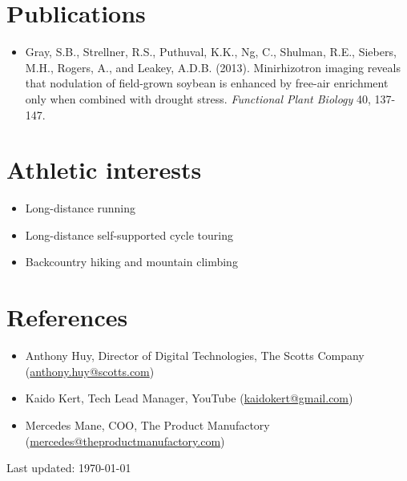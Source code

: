 \documentclass[letterpaper]{article}
\def\footerlink{}
\begin{document}
\section*{Publications}

  \begin{itemize}

    \item Gray, S.B., Strellner, R.S., Puthuval, K.K., Ng, C., Shulman, R.E., Siebers, M.H., Rogers, A., and Leakey, A.D.B. (2013). Minirhizotron imaging reveals that nodulation of field-grown soybean is enhanced by free-air  enrichment only when combined with drought stress. {\it Functional Plant Biology} 40, 137-147.

  \end{itemize}
  
\section*{Athletic interests}

  \begin{itemize}

    \item Long-distance running
    \item Long-distance self-supported cycle touring
    \item Backcountry hiking and mountain climbing

  \end{itemize}

\section*{References}

\begin{itemize}
  \item Anthony Huy, Director of Digital Technologies, The Scotts Company (\href{mailto:anthony.huy@scotts.com}{anthony.huy@scotts.com})
  \item Kaido Kert, Tech Lead Manager, YouTube (\href{mailto:kaidokert@gmail.com}{kaidokert@gmail.com})
  \item Mercedes Mane, COO, The Product Manufactory (\href{mailto:mercedes@theproductmanufactory.com}{mercedes@theproductmanufactory.com})
\end{itemize}

\bigskip

\begin{center}
  \begin{footnotesize}
    Last updated: \today \\
    \href{\footerlink}{\texttt{\footerlink}}
  \end{footnotesize}
\end{center}
\end{document}
